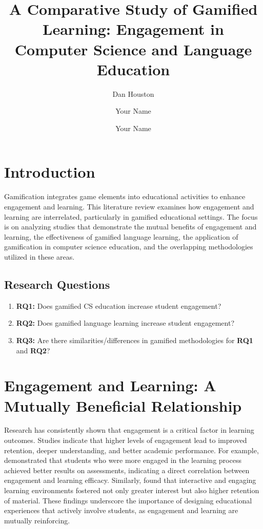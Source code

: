 \documentclass[sigconf,review]{acmart} %
\title{A Comparative Study of Gamified Learning: Engagement in Computer Science and Language Education}
\author{Dan Houston}
\affiliation{
  \institution{San Diego State University}
  \city{San Diego}
  \country{United States}
}
\author{Your Name}
\affiliation{
  \institution{San Diego State University}
  \city{San Diego}
  \country{United States}
}
\author{Your Name}
\affiliation{
  \institution{San Diego State University}
  \city{San Diego}
  \country{United States}
}
\begin{document}
\maketitle

\section{Introduction}
Gamification integrates game elements into educational activities to enhance engagement and learning. This literature review examines how engagement and learning are interrelated, particularly in gamified educational settings. The focus is on analyzing studies that demonstrate the mutual benefits of engagement and learning, the effectiveness of gamified language learning, the application of gamification in computer science education, and the overlapping methodologies utilized in these areas.

\subsection{Research Questions}

\begin{enumerate}
    \item \textbf{RQ1:} Does gamified CS education increase student engagement?
    \item \textbf{RQ2:} Does gamified language learning increase student engagement?
    \item \textbf{RQ3:} Are there similarities/differences in gamified methodologies for \textbf{RQ1} and \textbf{RQ2}?
\end{enumerate}

\section{Engagement and Learning: A Mutually Beneficial Relationship}
Research has consistently shown that engagement is a critical factor in learning outcomes. Studies indicate that higher levels of engagement lead to improved retention, deeper understanding, and better academic performance. For example, \citet{article1} demonstrated that students who were more engaged in the learning process achieved better results on assessments, indicating a direct correlation between engagement and learning efficacy. Similarly, \citet{article2} found that interactive and engaging learning environments fostered not only greater interest but also higher retention of material. These findings underscore the importance of designing educational experiences that actively involve students, as engagement and learning are mutually reinforcing.
\end{document}
